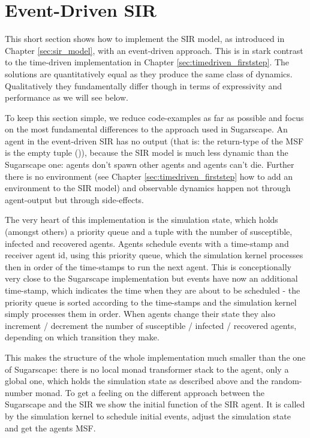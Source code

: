 \section{Event-Driven SIR}
\label{sec:eventdriven_sir}
This short section shows how to implement the SIR model, as introduced in Chapter \ref{sec:sir_model}, with an event-driven approach. This is in stark contrast to the time-driven implementation in Chapter \ref{sec:timedriven_firststep}. The solutions are quantitatively equal as they produce the same class of dynamics. Qualitatively they fundamentally differ though in terms of expressivity and performance as we will see below.

To keep this section simple, we reduce code-examples as far as possible and focus on the most fundamental differences to the approach used in Sugarscape. An agent in the event-driven SIR has no output (that is: the return-type of the MSF is the empty tuple ()), because the SIR model is much less dynamic than the Sugarscape one: agents don't spawn other agents and agents can't die. Further there is no environment (see Chapter \ref{sec:timedriven_firststep} how to add an environment to the SIR model) and observable dynamics happen not through agent-output but through side-effects.

The very heart of this implementation is the simulation state, which holds (amongst others) a priority queue and a tuple with the number of susceptible, infected and recovered agents. Agents schedule events with a time-stamp and receiver agent id, using this priority queue, which the simulation kernel processes then in order of the time-stamps to run the next agent. This is conceptionally very close to the Sugarscape implementation but events have now an additional time-stamp, which indicates the time when they are about to be scheduled - the priority queue is sorted according to the time-stamps and the simulation kernel simply processes them in order. When agents change their state they also increment / decrement the number of susceptible / infected / recovered agents, depending on which transition they make.

This makes the structure of the whole implementation much smaller than the one of Sugarscape: there is no local monad transformer stack to the agent, only a global one, which holds the simulation state as described above and the random-number monad. To get a feeling on the different approach between the Sugarscape and the SIR we show the initial function of the SIR agent. It is called by the simulation kernel to schedule initial events, adjust the simulation state and get the agents MSF.


